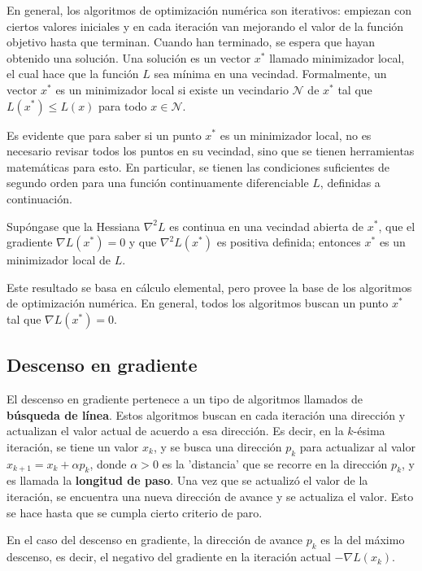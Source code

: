 En general, los algoritmos de optimización numérica son iterativos: empiezan con ciertos valores iniciales y en cada iteración van mejorando el valor de la función objetivo hasta que terminan. Cuando han terminado, se espera que hayan obtenido una solución. Una solución es un vector $x^*$ llamado minimizador local, el cual hace que la función $L$ sea mínima en una vecindad. Formalmente, un vector $x^*$ es un minimizador local si existe un vecindario $\mathcal{N}$ de $x^*$ tal que $L(x^*) \leq L(x)$ para todo $x \in \mathcal{N}$.

Es evidente que para saber si un punto $x^*$ es un minimizador local, no es necesario revisar todos los puntos en su vecindad, sino que se tienen herramientas matemáticas para esto. En particular, se tienen las condiciones suficientes de segundo orden para una función continuamente diferenciable $L$, definidas a continuación.

Supóngase que la Hessiana $\nabla^2 L$ es continua en una vecindad abierta de $x^*$, que el gradiente $\nabla L(x^*) = 0$ y que $\nabla^2 L(x^*)$ es positiva definida; entonces $x^*$ es un minimizador local de $L$.

Este resultado se basa en cálculo elemental, pero provee la base de los algoritmos de optimización numérica. En general, todos los algoritmos buscan un punto $x^*$ tal que $\nabla L(x^*) = 0$. 

\subsection{Descenso en gradiente}

El descenso en gradiente pertenece a un tipo de algoritmos llamados de \textbf{búsqueda de línea}. Estos algoritmos buscan en cada iteración una dirección y actualizan el valor actual de acuerdo a esa dirección. Es decir, en la $k$-ésima iteración, se tiene un valor $x_k$, y se busca una dirección $p_k$ para actualizar al valor $x_{k+1} = x_k + \alpha p_k$, donde $\alpha > 0$ es la 'distancia' que se recorre en la dirección $p_k$, y es llamada la \textbf{longitud de paso}. Una vez que se actualizó el valor de la iteración, se encuentra una nueva dirección de avance y se actualiza el valor. Esto se hace hasta que se cumpla cierto criterio de paro.

En el caso del descenso en gradiente, la dirección de avance $p_k$ es la del máximo descenso, es decir, el negativo del gradiente en la iteración actual $-\nabla L(x_k)$. 


